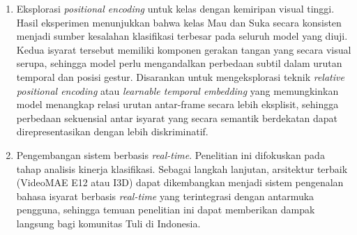 \begin{enumerate}
  \item Eksplorasi \textit{positional encoding} untuk kelas dengan kemiripan visual tinggi. Hasil eksperimen menunjukkan bahwa kelas Mau dan Suka secara konsisten menjadi sumber kesalahan klasifikasi terbesar pada seluruh model yang diuji. Kedua isyarat tersebut memiliki komponen gerakan tangan yang secara visual serupa, sehingga model perlu mengandalkan perbedaan subtil dalam urutan temporal dan posisi gestur. Disarankan untuk mengeksplorasi teknik \textit{relative positional encoding} atau \textit{learnable temporal embedding} yang memungkinkan model menangkap relasi urutan antar-frame secara lebih eksplisit, sehingga perbedaan sekuensial antar isyarat yang secara semantik berdekatan dapat direpresentasikan dengan lebih diskriminatif.

  \item Pengembangan sistem berbasis \textit{real-time}. Penelitian ini difokuskan pada tahap analisis kinerja klasifikasi. Sebagai langkah lanjutan, arsitektur terbaik (VideoMAE E12 atau I3D) dapat dikembangkan menjadi sistem pengenalan bahasa isyarat berbasis \textit{real-time} yang terintegrasi dengan antarmuka pengguna, sehingga temuan penelitian ini dapat memberikan dampak langsung bagi komunitas Tuli di Indonesia.
\end{enumerate}
